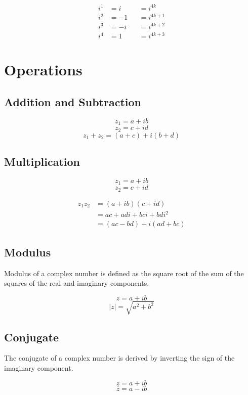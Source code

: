 \documentclass[
  14pt,
]{extarticle}
\begin{document}
\[
\begin{aligned}
i^1 &=i  &&= i^{4k}\\
i^2 &=-1 &&= i^{4k+1}\\
i^3 &=-i &&= i^{4k+2}\\
i^4 &=1  &&= i^{4k+3}
\end{aligned}
\]

\hypertarget{operations}{%
\section{Operations}\label{operations}}

\hypertarget{addition-and-subtraction}{%
\subsection{Addition and Subtraction}\label{addition-and-subtraction}}

\[z_1=a+ib\] \[z_2=c+id\] \[z_1+z_2=(a+c)+i(b+d)\]

\hypertarget{multiplication}{%
\subsection{Multiplication}\label{multiplication}}

\[z_1=a+ib\] \[z_2=c+id\]

\[
\begin{aligned}
z_1z_2&=(a+ib)(c+id)\\
&= ac+adi+bci+bdi^2\\
&= (ac-bd)+i(ad+bc)
\end{aligned}
\]

\hypertarget{modulus}{%
\subsection{Modulus}\label{modulus}}

Modulus of a complex number is defined as the square root of the sum of
the squares of the real and imaginary components.

\[z=a+ib\] \[|z|=\sqrt{a^2+b^2}\]

\hypertarget{conjugate}{%
\subsection{Conjugate}\label{conjugate}}

The conjugate of a complex number is derived by inverting the sign of
the imaginary component.

\[z=a+ib\] \[\overline z=a-ib\]
\end{document}
